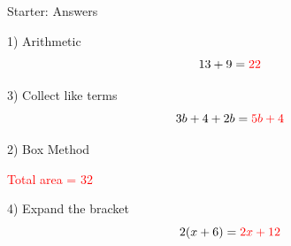 \documentclass{beamer}
\newcommand{\ealkey}[1]{\textcolor{ealkeycolour}{#1}}
\begin{document}
\begin{frame}{Starter: Answers}
\begin{minipage}[t]{0.48\textwidth}
\begin{block}{1) \ealkey{Arithmetic}}
\Large
\[
13 + 9 = \textcolor{red}{22}
\]
\end{block}

\vspace{6.2em}

\begin{block}{3) Collect \ealkey{like terms}}
\Large
\[
3b + 4 + 2b = \textcolor{red}{5b + 4}
\]
\end{block}
\end{minipage}\hfill
\begin{minipage}[t]{0.48\textwidth}
\begin{block}{2) \ealkey{Box Method}}
\centering
{}

\vspace{0.4em}
\textcolor{red}{Total \ealkey{area} = 32}
\end{block}

\vspace{0.6em}

\begin{block}{4) \ealkey{Expand} the \ealkey{bracket}}
\Large
\[
2(x+6) = \textcolor{red}{2x + 12}
\]
\end{block}
\end{minipage}
\end{frame}
\end{document}
